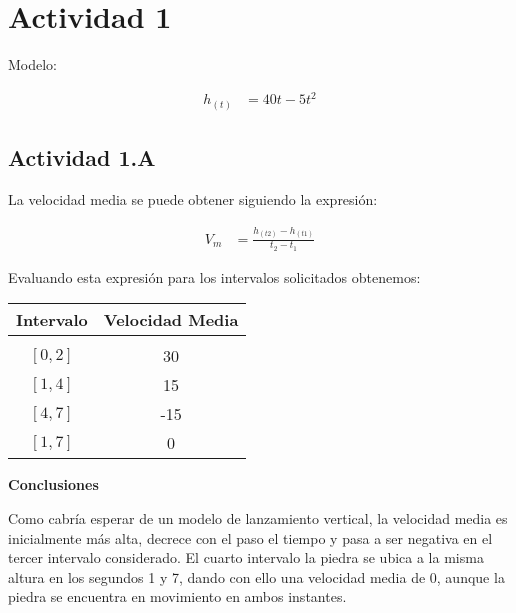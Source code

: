 \section*{Actividad 1}

Modelo:

\begin{align*}
	h_{(t)} &= 40t - 5t^2
\end{align*}

\subsection*{Actividad 1.A}

La velocidad media se puede obtener siguiendo la expresión:

\begin{align*}
	V_m &= \frac{h_{(t2)} - h_{(t1)}}{t_2 - t_1}
\end{align*}

Evaluando esta expresión para los intervalos solicitados obtenemos:

\begin{center}
\begin{tabular}{ c c }
	Intervalo	&	Velocidad Media \\
	\hline \\
	$[0, 2]$	&	30\\	
	$[1, 4]$	&	15\\
	$[4, 7]$	&	-15\\
	$[1, 7]$	&	0
\end{tabular}
\end{center}

\textbf{Conclusiones}

Como cabría esperar de un modelo de lanzamiento vertical, la velocidad media 
es inicialmente más alta, decrece con el paso el tiempo y 
pasa a ser negativa en el tercer intervalo considerado. 
El cuarto intervalo la piedra se ubica a la misma altura en los segundos 1 y 7,
dando con ello una velocidad media de 0, aunque la piedra se encuentra en 
movimiento en ambos instantes.


